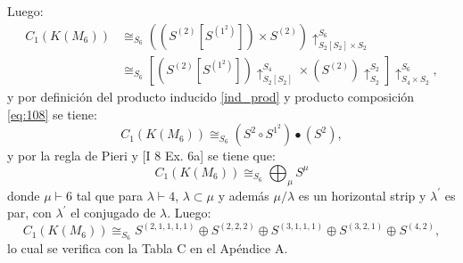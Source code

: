 \documentclass[12pt]{book}
\theoremstyle{definition}
\newcounter{in}
\newcounter{ini}
\begin{document}
\begin{center}
\end{center}
Luego:
\begin{equation}
\begin{aligned}
C_{1}(K(M_{6})) & \cong_{S_{6}} ((S^{(2)} \left [ S^{(1^{2})} \right ]) \times S^{(2)}) \uparrow_{S_{2} \left [ S_{2} \right ] \times S_{2}}^{S_{6}} \\
& \cong_{S_{6}} \left [ (S^{(2)} \left [ S^{(1^{2})} \right ]) \uparrow_{S_{2} \left [ S_{2} \right ]}^{S_{4}} \times (S^{(2)}) \uparrow_{S_{2}}^{S_{2}} \right ] \uparrow_{S_{4} \times S_{2}}^{S_{6}},
\end{aligned}
\end{equation}
y por definición del producto inducido \ref{ind_prod} y producto composición \ref{eq:108} se tiene:
\begin{equation}
C_{1}(K(M_{6})) \cong_{S_{6}} (S^{2}  \circ S^{1^{2}}) \bullet (S^{2}), 
\end{equation}
y por la regla de Pieri \cite{wachs2006poset} y \cite{macdonald1998symmetric} [I 8 Ex. 6a] se tiene que:
\begin{equation*}
C_{1}(K(M_{6})) \cong_{S_{6}} \bigoplus_{\mu} S^{\mu}
\end{equation*}
donde $\mu \vdash 6$ tal que para $\lambda \vdash 4$, $\lambda \subset \mu$ y además $\mu / \lambda$ es un horizontal strip y $\lambda^{'}$ es par, con $\lambda^{'}$ el conjugado de $\lambda$. Luego:
\begin{equation*}
C_{1}(K(M_{6})) \cong_{S_{6}}  S^{(2,1,1,1,1)} \oplus S^{(2,2,2)} \oplus S^{(3,1,1,1)} \oplus S^{(3,2,1)} \oplus S^{(4,2)},
\end{equation*}
lo cual se verifica con la Tabla C en el Apéndice A.
\end{document}
